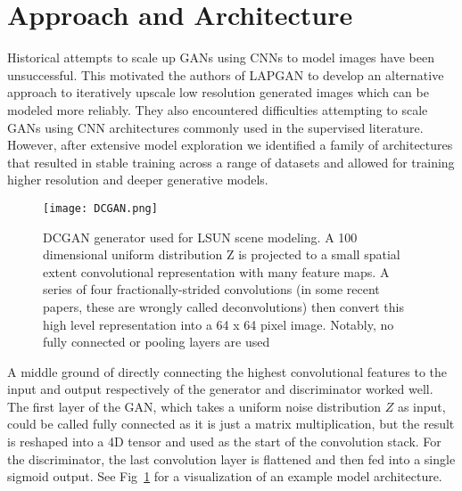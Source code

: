 \documentclass[10pt,twocolumn,letterpaper]{article}
\begin{document}
\section{Approach and Architecture}
Historical attempts to scale up GANs using CNNs to model images have been unsuccessful. This motivated the authors of LAPGAN to develop an alternative approach to iteratively upscale low resolution generated images which can be modeled more reliably. They also encountered difficulties attempting to scale GANs using CNN architectures commonly used in the
supervised literature. However, after extensive model exploration we identified a family of architectures that resulted in stable training across a range of datasets and allowed for training higher resolution and deeper generative models.
\begin{figure}[!htb]
   	\centering
   	\texttt{[image: DCGAN.png]}\\
   	\caption{DCGAN generator used for LSUN scene modeling. A 100 dimensional uniform distribution Z is projected to a small spatial extent convolutional representation with many feature maps. A series of four fractionally-strided convolutions (in some recent papers, these are wrongly called deconvolutions) then convert this high level representation into a 64 x 64 pixel image. Notably, no fully connected or pooling layers are used}\label{Figure1}
   \end{figure}
\par A middle ground of directly connecting the highest
convolutional features to the input and output respectively of the generator and discriminator worked well. The first layer of the GAN, which takes a uniform noise distribution $Z$ as input, could be called
fully connected as it is just a matrix multiplication, but the result is reshaped into a 4D tensor and used as the start of the convolution stack. For the discriminator, the last convolution layer is flattened and then fed into a single sigmoid output. See Fig~\ref{Figure1} for a visualization of an example model architecture.   


\end{document}
